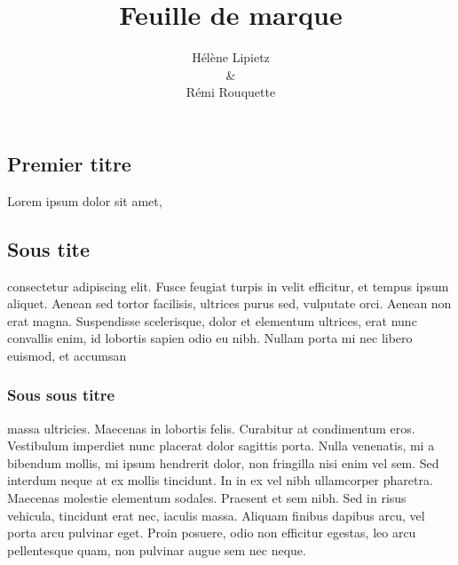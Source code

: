 \documentclass[twoside,a4paper]{article}
\makeatletter
\renewcommand{\maketitle}{
\strut\vfill
\begin{center}

\emph{\@title}

\@author

{\small\@date}

\end{center}
\vfill
}
\makeatother
\begin{document}
\fancyfoot[CE]{\thepage}
\fancyfoot[CO]{\thepage}
\fancyhead{}

\title{Feuille de marque}
\author{Hélène Lipietz\\
&\\
Rémi Rouquette
}

\begin{simple}

\maketitle

\end{simple}

\begin{triple}
\section{Premier titre}

Lorem ipsum dolor sit amet, 

\subsection{Sous tite}
consectetur adipiscing elit. Fusce feugiat turpis in velit efficitur, et tempus ipsum aliquet. Aenean sed 
tortor facilisis, ultrices purus sed, vulputate orci. Aenean non erat magna. Suspendisse scelerisque, dolor et elementum ultrices, erat nunc convallis enim, id lobortis sapien odio eu nibh. Nullam porta mi nec libero euismod, et accumsan

\subsubsection{Sous sous titre}
 massa ultricies. Maecenas in lobortis felis. Curabitur at condimentum eros. Vestibulum imperdiet nunc placerat dolor sagittis porta. Nulla venenatis, mi a bibendum mollis, mi ipsum hendrerit dolor, non fringilla nisi enim vel sem. Sed interdum neque at ex mollis tincidunt. In in ex vel nibh ullamcorper pharetra. Maecenas molestie elementum sodales. Praesent et sem nibh. Sed in risus vehicula, tincidunt erat nec, iaculis massa. Aliquam finibus dapibus arcu, vel porta arcu pulvinar eget. Proin posuere, odio non efficitur egestas, leo arcu pellentesque quam, non pulvinar augue sem nec neque.


\end{triple}
\end{document}
